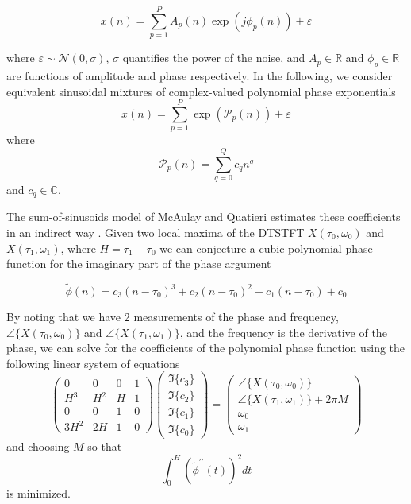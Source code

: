 \begin{equation}
    x(n)=\sum_{p=1}^{P} A_p(n) \exp(j \phi_p(n)) + \varepsilon
\end{equation}

where $\varepsilon \sim \mathcal{N}(0,\sigma)$, $\sigma$ quantifies the power of
the noise, and $A_p \in \mathbb{R}$ and $\phi_p \in \mathbb{R}$ are functions of
amplitude and phase respectively. In the following, we consider equivalent
sinusoidal mixtures of complex-valued polynomial phase exponentials
\begin{equation}
    x(n)=\sum_{p=1}^{P} \exp(\mathcal{P}_p(n)) + \varepsilon
\end{equation}
where
\begin{equation}
    \mathcal{P}_p(n) = \sum_{q=0}^{Q} c_q n^{q}
\end{equation}
and $c_q \in \mathbb{C}$.

The sum-of-sinusoids model of McAulay and Quatieri estimates these coefficients
in an indirect way \cite{mcaulay1986speech}. Given two local maxima of the
DTSTFT $X(\tau_0,\omega_0)$ and $X(\tau_1,\omega_1)$, where $H = \tau_1 -
\tau_0$ we can conjecture a cubic
polynomial phase function for the imaginary part of the phase argument

\begin{equation}
    \tilde{\phi}(n) = c_3 (n-\tau_0)^3 + c_2 (n-\tau_0)^2 + c_1 (n-\tau_0) + c_0
\end{equation}

By noting that we have 2 measurements of the phase and frequency,
$\angle\{X(\tau_0,\omega_0)\}$ and $\angle\{X(\tau_1,\omega_1)\}$, and the frequency
is the derivative of the phase, we can solve for the coefficients of the
polynomial phase function using the following linear system of equations
\begin{equation}
    \begin{pmatrix}
        0   & 0     & 0 & 1 \\
        H^3 & H^2   & H & 1 \\
        0   & 0     & 1 & 0 \\
        3 H^2 & 2 H & 1 & 0
    \end{pmatrix}
    \begin{pmatrix}
        \Im\{c_3\} \\
        \Im\{c_2\} \\
        \Im\{c_1\} \\
        \Im\{c_0\}
    \end{pmatrix}
    =
    \begin{pmatrix}
        \angle\{X(\tau_0,\omega_0)\} \\
        \angle\{X(\tau_1,\omega_1)\} + 2 \pi M \\
        \omega_0 \\
        \omega_1        
    \end{pmatrix}
\end{equation}
and choosing $M$ so that
\begin{equation}
    \label{eq:minfmmq}
    \int_{0}^{H}(\tilde{\phi}^{\prime\prime}(t))^{2}dt
\end{equation}
is minimized.

